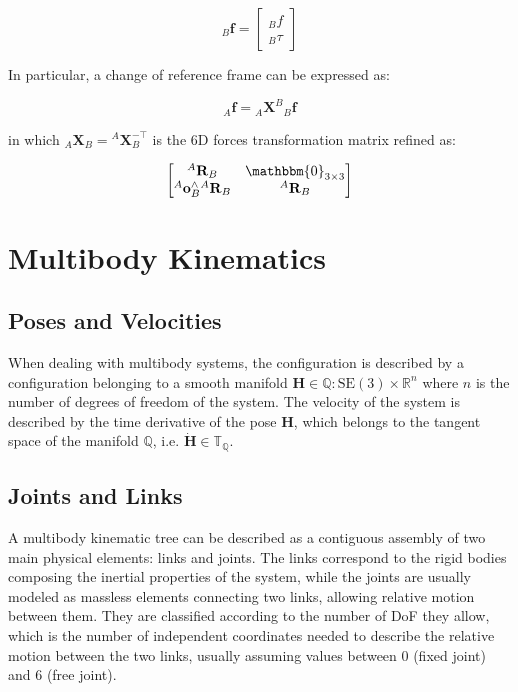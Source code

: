 \begin{equation}
    {}_{B}\mathbf{f} = \begin{bmatrix}
        {}_{B}f \\
        {}_{B}\tau
    \end{bmatrix}
\end{equation}

In particular, a change of reference frame can be expressed as:

\begin{equation}
    {}_{A}\mathbf{f} = {}_{A}\mathbf{X}^B {}_{B}\mathbf{f}
\end{equation}

in which ${}_{A}\mathbf{X}_B = {}^A\mathbf{X}_B ^{-\top}$ is the $6$D forces transformation matrix refined as:

\begin{equation}
    \begin{bmatrix}
        {}^A\mathbf{R}_B                         & \mathbbm{0}_{3 \times 3} \\
        {}^A\mathbf{o}_B^\wedge {}^A\mathbf{R}_B & {}^A\mathbf{R}_B
    \end{bmatrix}
\end{equation}

\section{Multibody Kinematics}

\subsection{Poses and Velocities}

When dealing with multibody systems, the configuration is described by a configuration belonging to a smooth manifold $\mathbf{H} \in \mathbb{Q} : \mathrm{SE}(3) \times \mathbb{R}^n$ where $n$ is the number of degrees of freedom of the system. The velocity of the system is described by the time derivative of the pose $\mathbf{H}$, which belongs to the tangent space of the manifold $\mathbb{Q}$, i.e. $\dot{\mathbf{H}} \in \mathbb{T}_{\mathbb{Q}}$.

\subsection{Joints and Links}

A multibody kinematic tree can be described as a contiguous assembly of two main physical elements: links and joints. The links correspond to the rigid bodies composing the inertial properties of the system, while the joints are usually modeled as massless elements connecting two links, allowing relative motion between them. They are classified according to the number of \ac{DoF} they allow, which is the number of independent coordinates needed to describe the relative motion between the two links, usually assuming values between 0 (fixed joint) and 6 (free joint).

